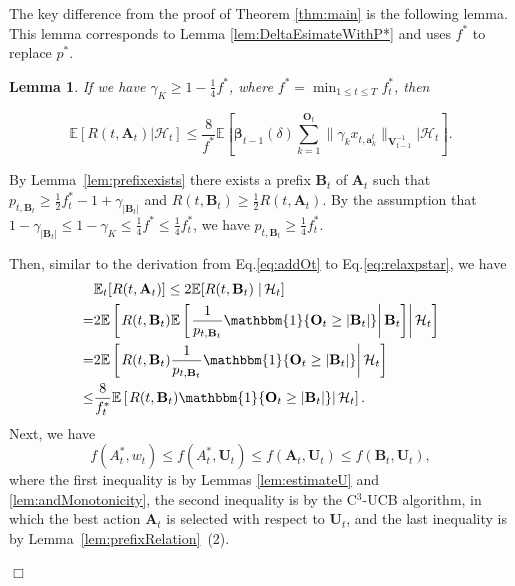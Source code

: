 \documentclass{article}
\newcommand{\bbeta}{\boldsymbol{\beta}}
\newcommand{\EE}{\mathbb{E}}
\newcommand{\bOne}{\mathbbm{1}}
\newcommand{\bA}{\mathbf{A}}
\newcommand{\ba}{\mathbf{a}}
\newcommand{\bB}{\mathbf{B}}
\newcommand{\bO}{\mathbf{O}}
\newcommand{\bU}{\mathbf{U}}
\newcommand{\bV}{\mathbf{V}}
\newcommand{\cH}{\mathcal{H}}
\newcommand{\abs}[1]{\left| #1 \right|}
\newcommand{\norm}[1]{\| #1 \|}
\newtheorem{lemma}[theorem]{Lemma}%
\newenvironment{proof}{\noindent {\textbf{Proof. }}}{$\Box$ \medskip}
\newcommand{\CEqDeltaEstAnd}{
	$$
	\EE [R(t, \bA_t) |\cH_t ] \leq \frac{8}{f^{\ast}} \EE \left[ \bbeta_{t-1}(\delta)\sum_{k=1}^{\bO_t}\norm{\gamma_k x_{t,\ba_k^t}}_{\bV_{t-1}^{-1}} | \cH_t\right].
	$$
}
\begin{document}
The key difference from the proof of Theorem \ref{thm:main} is the following lemma. This lemma corresponds to Lemma \ref{lem:DeltaEsimateWithP*} and uses $f^{\ast}$ to replace $p^{\ast}$.

\begin{lemma}
	If we have $\gamma_K \geq 1 -  \frac{1}{4} f^{\ast}$, where $f^{\ast} = \min_{1 \leq t \leq T} f_{t}^{\ast}$, then
	\CEqDeltaEstAnd
\end{lemma}
\begin{proof}
	By Lemma~\ref{lem:prefixexists} there exists a prefix $\bB_t$ of $\bA_t$ such that $p_{t, \bB_t} \geq \frac{1}{2}f_{t}^* - 1 + \gamma_{|\bB_t|}$ and $R(t, \bB_t) \geq \frac{1}{2} R(t, \bA_t)$. By the assumption that $1-\gamma_{|\bB_t|} \leq 1-\gamma_K \leq \frac{1}{4} f^{\ast} \leq \frac{1}{4} f^*_{t}  $, we have $p_{t, \bB_t} \geq \frac{1}{4}f_{t}^*$. 
	
	Then, similar to the derivation from Eq.\eqref{eq:addOt} to Eq.\eqref{eq:relaxpstar}, we have
	\begin{align}
		&\EE_t[R(t, \bA_t)] \leq 2 \EE[R(t, \bB_t) \left. \right| \cH_t] \nonumber \\
		=& 2 \EE \left[ \left. R(t, \bB_t) \EE \left[ \left. \frac{1}{p_{t, \bB_t}} \bOne\{\bO_t\geq\abs{\bB_t}\} \right| \bB_t \right]  \right| \cH_t \right] \nonumber \\
		=& 2\EE \left[ \left. R(t, \bB_t) \frac{1}{p_{t, \bB_t}} \bOne\{\bO_t\geq\abs{\bB_t}\}  \right| \cH_t \right] \nonumber \\
		\leq &\frac{8}{f_{t}^{\ast}} \EE \left[ \left. R(t, \bB_t) \bOne\{\bO_t\geq\abs{\bB_t}\}  \right| \cH_t \right]. \label{eq:btOneotbt}
	\end{align}
	Next, we have
	\begin{equation} \label{eq:andstarbt}
		f(A_t^*, w_t) \leq f(A_t^*,\bU_t) \leq f(\bA_t,\bU_t) \leq f(\bB_t,\bU_t),
	\end{equation}
	where the first inequality is by Lemmas \ref{lem:estimateU} and \ref{lem:andMonotonicity}, the second inequality is by the C$^3$-UCB algorithm, in which the best action $\bA_t$ is selected with respect to $\bU_t$, and the last inequality is by Lemma~\ref{lem:prefixRelation}~(2).
	

\end{proof}
\end{document}
